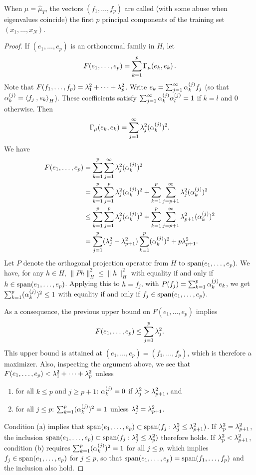 \begin{definition}
\label{def:princ.comp}
When $\mu = \hat \mu_T$, the vectors $(f_1, \ldots, f_p)$ are
called (with some abuse when eigenvalues coincide) the first $p$ principal components of the training set $(x_1, \ldots, x_N)$. 
\end{definition}
\begin{proof}
If $(e_1, \ldots, e_p)$ is an orthonormal family in $H$, let 
\[
F(e_1, \ldots, e_p) = \sum_{k=1}^p \Gamma_\mu(e_k, e_k)\,.
\]
Note that $F(f_1, \ldots, f_p) = \lambda^2_1 + \cdots + \lambda^2_p$.
Write $e_k = \sum_{j=1}^\infty \alpha_{k}^{(j)} f_j$ (so that $\alpha_{k}^{(j)} = {\langle {f_j}\mathbin{,} {e_k}\rangle}_H$). These coefficients satisfy $\sum_{j=1}^\infty \alpha_{k}^{(j)}\alpha_{l}^{(j)} = 1$ if $k=l$ and 0 otherwise. Then
\[
\Gamma_\mu(e_k, e_k) = \sum_{j=1}^\infty \lambda^2_j (\alpha_{k}^{(j)})^2.
\]
We have
\begin{align*}
F(e_1, \ldots, e_p) &= \sum_{k=1}^p \sum_{j=1}^\infty \lambda^2_j (\alpha_{k}^{(j)})^2\\
& = \sum_{k=1}^p \sum_{j=1}^p \lambda^2_j (\alpha_{k}^{(j)})^2 + \sum_{k=1}^p \sum_{j=p+1}^\infty \lambda^2_j (\alpha_{k}^{(j)})^2\\
& \leq \sum_{k=1}^p \sum_{j=1}^p \lambda^2_j (\alpha_{k}^{(j)})^2 + \sum_{k=1}^p \sum_{j=p+1}^\infty \lambda^2_{p+1} (\alpha_{k}^{(j)})^2\\
& = \sum_{j=1}^p (\lambda^2_j-\lambda^2_{p+1}) \sum_{k=1}^p (\alpha_{k}^{(j)})^2 + p\lambda^2_{p+1}.
\end{align*}
Let $P$ denote the orthogonal projection operator from $H$ to $\mathrm{span}(e_1, \ldots, e_p)$. We have, for any $h\in H$, $\|Ph\|_H^2 \leq \|h\|_H^2$ with equality if and only if $h\in\mathrm{span}(e_1, \ldots, e_p)$. Applying this to $h=f_j$, with $P(f_j) = \sum_{k=1}^p \alpha_{k}^{(j)} e_k$, we get $\sum_{k=1}^p  (\alpha_{k}^{(j)})^2 \leq 1$ with equality if and only if $f_j\in \mathrm{span}(e_1, \ldots, e_p)$. 

As a consequence, the previous upper bound on $F(e_1, \ldots, e_p)$ implies 
\[
F(e_1, \ldots, e_p) \leq  \sum_{j=1}^p \lambda^2_j.
\]
This upper bound is attained at $(e_1, \ldots, e_p) = (f_1, \ldots, f_p)$, which is therefore a maximizer. Also,  inspecting the argument above, we see that $F(e_1, \ldots, e_p) < \lambda^2_1 + \cdots + \lambda^2_p$ unless
\begin{enumerate}[label=(\alph*)]
\item for all $k\leq p$ and $j\geq p+1$: $\alpha_{k}^{(j)} = 0$ if $\lambda^2_j > \lambda^2_{p+1}$, and
\item for all $j\leq p$: $\sum_{k=1}^p (\alpha_{k}^{(j)})^2 = 1$ unless $\lambda^2_j = \lambda^2_{p+1}$.
\end{enumerate}
Condition (a) implies that $\mathrm{span}(e_1, \ldots, e_p) \subset \mathrm{span}(f_j: \lambda^2_j \leq \lambda^2_{p+1})$. If $\lambda^2_p = \lambda^2_{p+1}$, the inclusion 
$\mathrm{span}(e_1, \ldots,
e_p) \subset \text{span}(f_j: \lambda^2_j \leq \lambda^2_p)$ therefore holds. 
If $\lambda^2_p < \lambda^2_{p+1}$, condition (b) requires $\sum_{k=1}^p (\alpha_{k}^{(j)})^2 = 1$ for all $j\leq p$, which implies $f_j \in\mathrm{span}(e_1, \ldots, e_p)$ for $j\leq p$, so that $\mathrm{span}(e_1, \ldots, e_p) = \mathrm{span}(f_1, \ldots, f_p)$ and  the inclusion also hold.


\end{proof}
